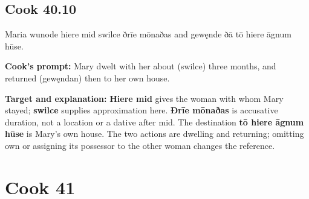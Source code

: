 \par\begin{minipage}{\linewidth}\raggedright
\subsection*{Cook 40.10}

Maria wunode hiere mid swilce ðrīe mōnaðas and gewęnde ðā tō hiere āgnum hūse.

\textbf{Cook's prompt:} Mary dwelt with her about (swilce) three months, and returned (gewęndan) then to her own house.

\textbf{Target and explanation:} \textbf{Hiere mid} gives the woman with whom Mary stayed; \textbf{swilce} supplies approximation here. \textbf{Ðrīe mōnaðas} is accusative duration, not a location or a dative after mid. The destination \textbf{tō hiere āgnum hūse} is Mary's own house. The two actions are dwelling and returning; omitting own or assigning its possessor to the other woman changes the reference.

\end{minipage}\par\addvspace{4pt}

\clearpage
\section*{Cook 41}

